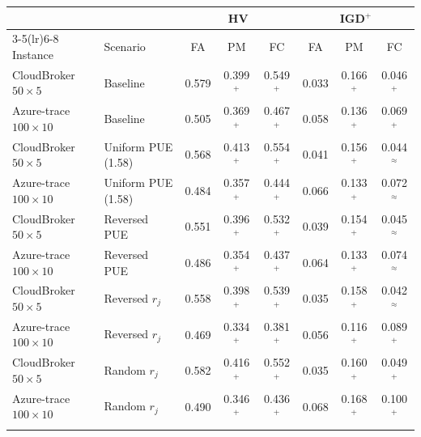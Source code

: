 \begin{tabular}{llcccccc}
\toprule
 & & \multicolumn{3}{c}{HV} & \multicolumn{3}{c}{IGD$^{+}$} \\
\cmidrule(lr){3-5}\cmidrule(lr){6-8}
Instance & Scenario & FA & PM & FC & FA & PM & FC \\
\midrule
CloudBroker $50\times5$ & Baseline & 0.579 & 0.399$^{+}$ & 0.549$^{+}$ & 0.033 & 0.166$^{+}$ & 0.046$^{+}$ \\
Azure-trace $100\times10$ & Baseline & 0.505 & 0.369$^{+}$ & 0.467$^{+}$ & 0.058 & 0.136$^{+}$ & 0.069$^{+}$ \\
CloudBroker $50\times5$ & Uniform PUE (1.58) & 0.568 & 0.413$^{+}$ & 0.554$^{+}$ & 0.041 & 0.156$^{+}$ & 0.044$^{\approx}$ \\
Azure-trace $100\times10$ & Uniform PUE (1.58) & 0.484 & 0.357$^{+}$ & 0.444$^{+}$ & 0.066 & 0.133$^{+}$ & 0.072$^{\approx}$ \\
CloudBroker $50\times5$ & Reversed PUE & 0.551 & 0.396$^{+}$ & 0.532$^{+}$ & 0.039 & 0.154$^{+}$ & 0.045$^{\approx}$ \\
Azure-trace $100\times10$ & Reversed PUE & 0.486 & 0.354$^{+}$ & 0.437$^{+}$ & 0.064 & 0.133$^{+}$ & 0.074$^{\approx}$ \\
CloudBroker $50\times5$ & Reversed $r_j$ & 0.558 & 0.398$^{+}$ & 0.539$^{+}$ & 0.035 & 0.158$^{+}$ & 0.042$^{\approx}$ \\
Azure-trace $100\times10$ & Reversed $r_j$ & 0.469 & 0.334$^{+}$ & 0.381$^{+}$ & 0.056 & 0.116$^{+}$ & 0.089$^{+}$ \\
CloudBroker $50\times5$ & Random $r_j$ & 0.582 & 0.416$^{+}$ & 0.552$^{+}$ & 0.035 & 0.160$^{+}$ & 0.049$^{+}$ \\
Azure-trace $100\times10$ & Random $r_j$ & 0.490 & 0.346$^{+}$ & 0.436$^{+}$ & 0.068 & 0.168$^{+}$ & 0.100$^{+}$ \\
\botrule
\end{tabular}